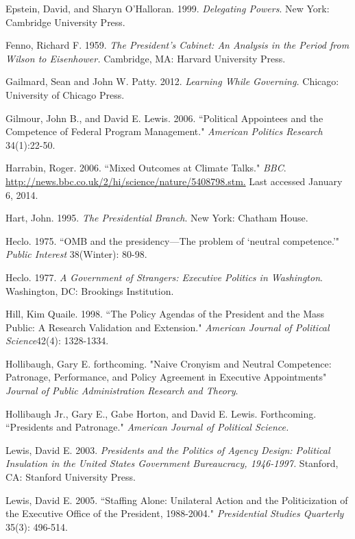 \documentclass[12pt]{article}
\begin{document}
\noindent \hangindent=0.7cm Epstein, David, and Sharyn O'Halloran. 1999. \textit{Delegating Powers}. New York: Cambridge University Press. 

\noindent \hangindent=0.7cm Fenno, Richard F. 1959. \textit{The President's Cabinet: An Analysis in the Period from Wilson to Eisenhower.} Cambridge, MA: Harvard University Press.

\noindent \hangindent=0.7cm Gailmard, Sean and John W. Patty. 2012. \textit{Learning While Governing.} Chicago: University of Chicago Press. 

\noindent \hangindent=0.7cm Gilmour, John B., and David E. Lewis. 2006. ``Political Appointees and the Competence of Federal Program Management." \textit{American Politics Research} 34(1):22-50. 

\noindent \hangindent=0.7cm Harrabin, Roger. 2006.  ``Mixed Outcomes at Climate Talks." \textit{BBC}. \url{http://news.bbc.co.uk/2/hi/science/nature/5408798.stm.} Last accessed January 6, 2014.

\noindent \hangindent=0.7cm Hart, John. 1995. \textit{The Presidential Branch}.  New York: Chatham House.

\noindent \hangindent=0.7cm Heclo. 1975. ``OMB and the presidency---The problem of `neutral competence.'" \textit{Public Interest} 38(Winter): 80-98.

\noindent \hangindent=0.7cm Heclo. 1977. \textit{A Government of Strangers: Executive Politics in Washington}. Washington, DC: Brookings Institution.

\noindent \hangindent=0.7cm Hill, Kim Quaile. 1998. ``The Policy Agendas of the President and the Mass Public: A Research Validation and Extension." \textit{American Journal of Political Science}42(4): 1328-1334.

\noindent \hangindent=0.7cm Hollibaugh, Gary E. forthcoming. "Naive Cronyism and Neutral Competence: Patronage, Performance, and Policy Agreement in Executive Appointments" \textit{Journal of Public Administration Research and Theory}. 

\noindent \hangindent=0.7cm Hollibaugh Jr., Gary E., Gabe Horton, and David E. Lewis. Forthcoming. ``Presidents and Patronage." \textit{American Journal of Political Science.}

\noindent \hangindent=0.7cm Lewis, David E. 2003. \textit{Presidents and the Politics of Agency Design: Political Insulation in the United States Government Bureaucracy, 1946-1997.} Stanford, CA: Stanford University Press.

\noindent \hangindent=0.7cm Lewis, David E. 2005. ``Staffing Alone: Unilateral Action and the Politicization of the Executive Office of the President, 1988-2004." \textit{Presidential Studies Quarterly} 35(3): 496-514.
\end{document}
